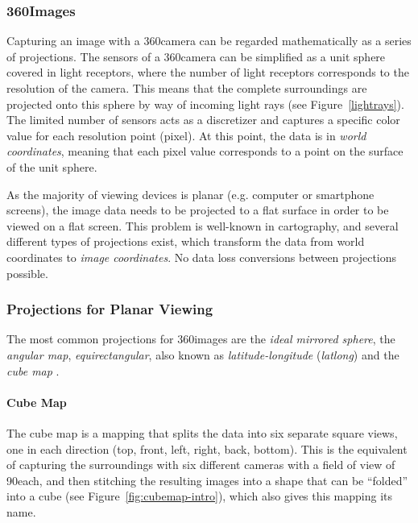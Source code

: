 \subsubsection{360\degree Images}\label{fundamentals_360}
Capturing an image with a 360\degree camera can be regarded mathematically as a series of projections. The sensors of a 360\degree camera can be simplified as a unit sphere covered in light receptors, where the number of light receptors corresponds to the resolution of the camera. This means that the complete surroundings are projected onto this sphere by way of incoming light rays (see Figure~\ref{lightrays}). The limited number of sensors acts as a discretizer and captures a specific color value for each resolution point (pixel). At this point, the data is in \emph{world coordinates}, meaning that each pixel value corresponds to a point on the surface of the unit sphere. 

As the majority of viewing devices is planar (e.g. computer or smartphone screens), the image data needs to be projected to a flat surface in order to be viewed on a flat screen. This problem is well-known in cartography, and several different types of projections exist, which transform the data from world coordinates to \emph{image coordinates}. No data loss \ar conversions between projections possible.

\subsubsection{Projections for Planar Viewing \label{projections} \cite{hdrbook}}
The most common projections for 360\degree images are the \emph{ideal mirrored sphere}, the \emph{angular map},  \emph{equirectangular}, also known as \emph{latitude-longitude} (\emph{latlong}) and the \emph{cube map} \cite{hdrbook}.

\paragraph{Cube Map}
The cube map is a mapping that splits the data into six separate square views, one in each direction (top, front, left, right, back, bottom). This is the equivalent of capturing the surroundings with six different cameras with a field of view of 90\degree each, and then stitching the resulting images into a shape that can be ``folded'' into a cube (see Figure~\ref{fig:cubemap-intro}), which also gives this mapping its name.

